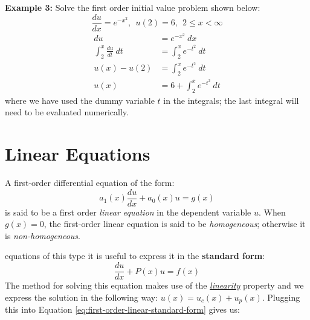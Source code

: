 \begin{example}[h!]
\textbf{Example 3:}
Solve the first order initial value problem shown below:
\begin{equation*}
\frac{du}{dx} = e^{-x^2}, \ \ u(2) = 6, \ \ 2 \le x < \infty
\end{equation*}
\begin{align*}
du &= e^{-x^2}\ dx \\
\int_2^{x} \frac{du}{dt} \ dt &= \int_{2}^{x} e^{-t^2} \ dt \\
u(x) - u(2) &= \int_{2}^{x} e^{-t^2} \ dt \\
u(x) &= 6 + \int_{2}^{x} e^{-t^2} \ dt
\end{align*}
where we have used the dummy variable $t$ in the integrals; the last integral will need to be evaluated numerically.

\end{example}

\section{Linear Equations}
A first-order differential equation of the form:
\begin{equation}
a_1(x)\frac{du}{dx} + a_0(x)u = g(x)
\label{eq:lin_first_order}
\end{equation}
is said to be a first order \emph{linear equation} in the dependent variable $u$.
When $g(x) = 0$, the first-order linear equation is said to be \emph{homogeneous}; otherwise it is \emph{non-homogeneous}.

 equations of this type it is useful to express it in the \textbf{standard form}:
\begin{equation}
\frac{du}{dx}+P(x)u = f(x)
\label{eq:first-order-linear-standard-form}
\end{equation}  
The method for solving this equation makes use of the \underline{\emph{linearity}} property and we express the solution in the following way: $u(x) = u_c(x) + u_p(x)$. Plugging this into Equation \ref{eq:first-order-linear-standard-form} gives us:

